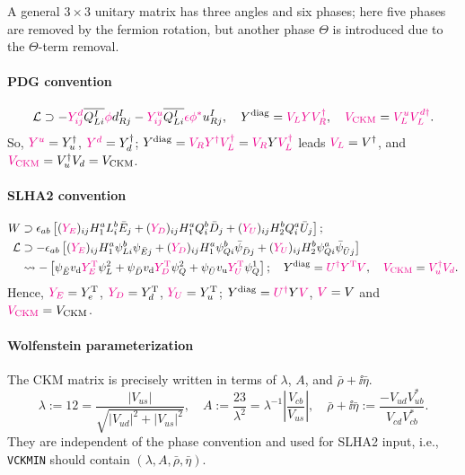 \documentclass[CheatSheet]{subfiles}
\begin{document}
A general $3\times3$ unitary matrix has three angles and six phases; here five phases are removed by the fermion rotation, but another phase $\Theta$ is introduced due to the $\Theta$-term removal.


\paragraph{PDG convention} \cite[\S12]{PDG2018}\cite[\S12]{PDG2020}
\begin{equation}
 \mathcal L \supset
 -{\color{magenta}Y^d_{ij}}\overline{Q_{Li}^I}{\color{magenta}\phi} d_{Rj}^I
 -{\color{magenta}Y^u_{ij}}\overline{Q_{Li}^I}{\color{magenta}\epsilon\phi^*}u_{Rj}^I,
\quad Y^{\mathrm{diag}} = {\color{magenta}V_L Y V_R^\dagger},
\quad {\color{magenta}V_{\mathrm{CKM}}} = {\color{magenta}V^u_LV_L^{d\dagger}}.
\end{equation}
So, ${\color{magenta}Y^u}=Y_{u}^\dagger$, ${\color{magenta}Y^d}=Y_{d}^\dagger$;
$Y^{\mathrm{diag}} = {\color{magenta}V_RY^\dagger V_L^\dagger} = {\color{magenta}V_R}Y{\color{magenta}V_L^\dagger}$ leads ${\color{magenta}V_L}=V^\dagger$, and
${\color{magenta}V_{\mathrm{CKM}}}=V_u^\dagger V_d=V_{\mathrm{CKM}}$.

\paragraph{SLHA2 convention} \cite{SLHA2}
\begin{align}
 W &\supset \epsilon_{ab}\left[
({\color{magenta}Y_E})_{ij}H_1^a L_i^b \bar E_j
+({\color{magenta}Y_D})_{ij}H_1^a Q_i^b \bar D_j
+({\color{magenta}Y_U})_{ij}H_2^b Q_i^a \bar U_j
\right];
\\
\mathcal L&\supset
- \epsilon_{ab}\left[
({\color{magenta}Y_E})_{ij}H_1^a \psi_{Li}^b \psi_{\bar Ej}
+({\color{magenta}Y_D})_{ij}H_1^a \psi_{Qi}^b \bar \psi_{\bar Dj}
+({\color{magenta}Y_U})_{ij}H_2^b \psi_{Qi}^a \bar \psi_{\bar Uj}
\right]
\\&\leadsto
- \left[
\psi_{\bar E}v_{\mathrm{d}} {\color{magenta}Y_E^{\mathrm{T}}}\psi_L^2
+\psi_{\bar D}v_{\mathrm{d}}{\color{magenta}Y_D^{\mathrm{T}}}\psi_Q^2
+\psi_{\bar U}v_{\mathrm{u}}{\color{magenta}Y_U^{\mathrm{T}}}\psi_Q^1
\right];
\quad
Y^{\mathrm{diag}} = {\color{magenta}U^\dagger Y^{\mathrm{T}} V},
\quad
{\color{magenta}V_{\mathrm{CKM}}} = {\color{magenta}V_u^\dagger V_d}.
\end{align}
Hence, ${\color{magenta}Y_E}=Y_{e}^{\mathrm{T}}$, ${\color{magenta}Y_D}=Y_{d}^{\mathrm{T}}$, ${\color{magenta}Y_U}=Y_{u}^{\mathrm{T}}$;
$Y^{\mathrm{diag}}={\color{magenta}U^\dagger}Y{\color{magenta}V}$, ${\color{magenta}V}=V$ and ${\color{magenta}V_{\mathrm{CKM}}}=V_{\mathrm{CKM}}$.

\paragraph{Wolfenstein parameterization}
The CKM matrix is precisely written in terms of $\lambda$, $A$, and $\bar\rho+\ii\bar\eta$.
\begin{equation}
  \lambda := \si{12} = \frac{|V_{us}|}{\sqrt{|V_{ud}|^2+|V_{us}|^2}},
\quad
  A:=\frac{\si{23}}{\lambda^2}=\lambda^{-1}\left|\frac{V_{cb}}{V_{us}}\right|,
\quad
\bar\rho+\ii\bar\eta:=\frac{-V_{ud}V^*_{ub}}{V_{cd}V^*_{cb}}.
\end{equation}
They are independent of the phase convention and used for SLHA2 input, i.e., \texttt{VCKMIN} should contain $(\lambda, A, \bar\rho, \bar\eta)$.
\end{document}
